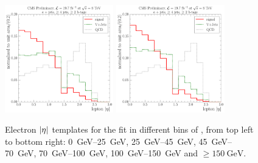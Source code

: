 \begin{figure}[!htbp]
  	\hspace*{\fill} \\
  	\hspace*{\fill}
  	{\includegraphics[width=0.42\textwidth]{measurement/MET/central/fit_templates/electron_templates_bin_100-150}}\hfill
  	{\includegraphics[width=0.42\textwidth]{measurement/MET/central/fit_templates/electron_templates_bin_150-inf}}
  	\hspace*{\fill}
    \caption{Electron $\lvert \eta \rvert$ templates for the fit in different bins of \MET, from top left to bottom right:
    \SIrange{0}{25}{\GeV}, \SIrange{25}{45}{\GeV}, \SIrange{45}{70}{\GeV}, \SIrange{70}{100}{\GeV},
    \SIrange{100}{150}{\GeV} and $\geq \SI{150}{\GeV}$.}
    \label{fig:fit_templates_MET_electron}
\end{figure}

